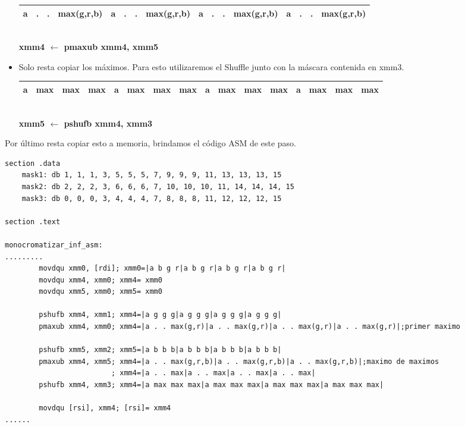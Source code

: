 \begin{itemize}
		\begin{center}
		   \begin{tabular}{| c | c | c | c || c | c | c | c || c | c | c | c || c | c | c | c |}
			 \hline
			 a & . & . & max(g,r,b) & a & . & . & max(g,r,b) & a & . & . & max(g,r,b) & a & . & . & max(g,r,b)  \\ \hline
		   \end{tabular}
		   \\ \textbf{xmm4 $\gets$ pmaxub xmm4, xmm5}
		\end{center}


	\item Solo resta copiar los máximos. Para esto utilizaremos el Shuffle junto con la máscara contenida en xmm3.

		\begin{center}
		   \begin{tabular}{| c | c | c | c || c | c | c | c || c | c | c | c || c | c | c | c |}
			 \hline
			 a & max & max & max & a & max & max & max & a & max & max & max & a & max & max & max  \\ \hline
		   \end{tabular}
		   \\ \textbf{xmm5 $\gets$ pshufb xmm4, xmm3}
		\end{center}

\end{itemize}

Por último resta copiar esto a memoria, brindamos el código ASM de este paso.

\begin{codesnippet}
\begin{verbatim}
section .data
	mask1: db 1, 1, 1, 3, 5, 5, 5, 7, 9, 9, 9, 11, 13, 13, 13, 15
	mask2: db 2, 2, 2, 3, 6, 6, 6, 7, 10, 10, 10, 11, 14, 14, 14, 15
	mask3: db 0, 0, 0, 3, 4, 4, 4, 7, 8, 8, 8, 11, 12, 12, 12, 15

section .text

monocromatizar_inf_asm:
.........
		movdqu xmm0, [rdi]; xmm0=|a b g r|a b g r|a b g r|a b g r|
		movdqu xmm4, xmm0; xmm4= xmm0
		movdqu xmm5, xmm0; xmm5= xmm0

		pshufb xmm4, xmm1; xmm4=|a g g g|a g g g|a g g g|a g g g|
		pmaxub xmm4, xmm0; xmm4=|a . . max(g,r)|a . . max(g,r)|a . . max(g,r)|a . . max(g,r)|;primer maximo
 
		pshufb xmm5, xmm2; xmm5=|a b b b|a b b b|a b b b|a b b b|			
		pmaxub xmm4, xmm5; xmm4=|a . . max(g,r,b)|a . . max(g,r,b)|a . . max(g,r,b)|;maximo de maximos
						 ; xmm4=|a . . max|a . . max|a . . max|a . . max|	
		pshufb xmm4, xmm3; xmm4=|a max max max|a max max max|a max max max|a max max max|

		movdqu [rsi], xmm4; [rsi]= xmm4
......
\end{verbatim}
\end{codesnippet}